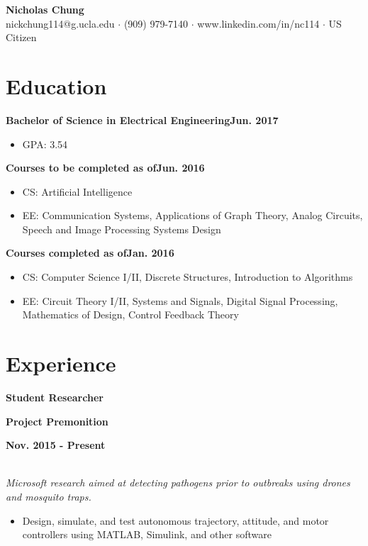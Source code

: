\documentclass[12pt]{article}
\newcommand\textbox[1]{\parbox{.333\textwidth}{#1}}
\newcommand{\textlcr}[3]{\textbox{\textbf{#1}\hfill}\textbox{\hfil \textbf{#2}\hfil}\textbox{\hfill \textbf{#3}}}
\begin{document}
\begin{center}
	\textbf{\LARGE Nicholas Chung} \\ \vspace{.5ex}
	nickchung114@g.ucla.edu $\cdot$ (909) 979-7140 $\cdot$ www.linkedin.com/in/nc114 $\cdot$ US Citizen
\end{center}

\vspace{-8pt}
\smallskip
\section*{Education}
\vspace*{-1em}\makebox[\linewidth]{\rule{\textwidth}{0.4pt}}

\textbf{Bachelor of Science in Electrical Engineering}\hfill\textbf{Jun. 2017}
\begin{itemize}
\item GPA: 3.54
\end{itemize}

\textbf{Courses to be completed as of}\hfill\textbf{Jun. 2016}
\begin{itemize}
\item CS: Artificial Intelligence
\item EE: Communication Systems, Applications of Graph Theory, Analog Circuits, Speech and Image Processing Systems Design
\end{itemize}

\textbf{Courses completed as of}\hfill\textbf{Jan. 2016}
\begin{itemize}
\item CS: Computer Science I/II, Discrete Structures, Introduction to Algorithms
\item EE: Circuit Theory I/II, Systems and Signals, Digital Signal Processing, Mathematics of Design, Control Feedback Theory
\end{itemize}

\section*{Experience}
\vspace*{-1em}\makebox[\linewidth]{\rule{\textwidth}{0.4pt}}

\textlcr{Student Researcher}{Project Premonition}{Nov. 2015 - Present} \\
\textit{Microsoft research aimed at detecting pathogens prior to outbreaks using drones and mosquito traps.}
\begin{itemize}
\item Design, simulate, and test autonomous trajectory, attitude, and motor controllers using MATLAB, Simulink, and other software
\end{itemize}
\end{document}
